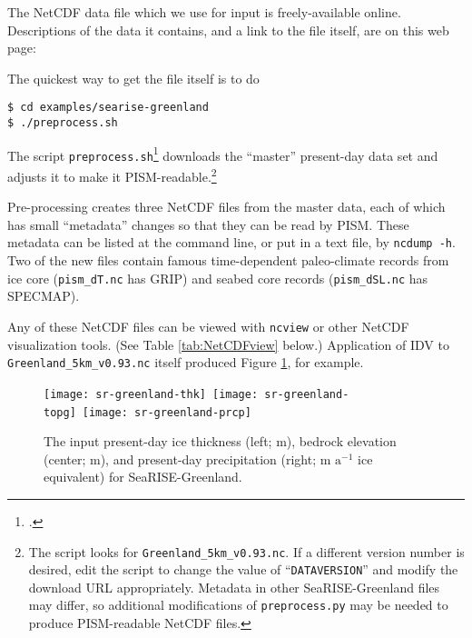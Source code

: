 The NetCDF data file which we use for input is freely-available online.  Descriptions of the data it contains, and a link to the file itself, are on this web page: 
\medskip

\centerline{}
\medskip

\noindent The quickest way to get the file itself is to do
\begin{verbatim}
$ cd examples/searise-greenland
$ ./preprocess.sh
\end{verbatim}
\noindent The script \texttt{preprocess.sh}\footnote{.} downloads the ``master'' present-day data set and adjusts it to make it PISM-readable.\footnote{The script looks for \texttt{Greenland\_5km\_v0.93.nc}.  If a different version number is desired, edit the script to change the value of ``\texttt{DATAVERSION}'' and modify the download URL appropriately.  Metadata in other SeaRISE-Greenland files may differ, so additional modifications of \texttt{preprocess.py} may be needed to produce PISM-readable NetCDF files.}

Pre-processing creates three NetCDF files from the master data, each of which has small ``metadata'' changes so that they can be read by PISM.  These metadata can be listed at the command line, or put in a text file, by \texttt{ncdump -h}.  Two of the new files contain famous time-dependent paleo-climate records from ice core (\texttt{pism_dT.nc} has GRIP) and seabed core records (\texttt{pism_dSL.nc} has SPECMAP).

Any of these NetCDF files can be viewed with \texttt{ncview} or other NetCDF visualization tools.  (See Table \ref{tab:NetCDFview} below.)  Application of IDV to \texttt{Greenland_5km_v0.93.nc} itself produced Figure \ref{fig:sr-input}, for example.

\begin{figure}[ht]
\centering
\mbox{\texttt{[image: sr-greenland-thk]}
  \qquad
  \texttt{[image: sr-greenland-topg]}
  \qquad
  \texttt{[image: sr-greenland-prcp]}}
\caption{The input present-day ice thickness (left; m), bedrock elevation (center; m), and present-day precipitation (right; m $\text{a}^{-1}$ ice equivalent) for SeaRISE-Greenland.}
\label{fig:sr-input}
\end{figure}


